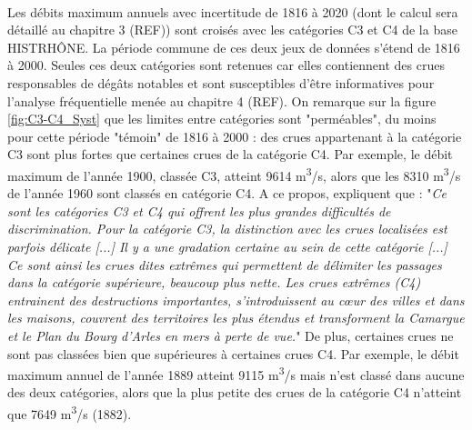 	\paragraph{} Les débits maximum annuels avec incertitude de 1816 à 2020 (dont le calcul sera détaillé au chapitre 3 (REF)) sont croisés avec les catégories C3 et C4 de la base HISTRHÔNE. La période commune de ces deux jeux de données s'étend de 1816 à 2000. Seules ces deux catégories sont retenues car elles contiennent des crues responsables de dégâts notables et sont susceptibles d'être informatives pour l'analyse fréquentielle menée au chapitre 4 (REF). On remarque sur la figure \ref{fig:C3-C4_Syst} que les limites entre catégories sont "perméables", du moins pour cette période "témoin" de 1816 à 2000 : des crues appartenant à la catégorie C3 sont plus fortes que certaines crues de la catégorie C4. Par exemple, le débit maximum de l'année 1900, classée C3, atteint 9614 m\textsuperscript{3}/s, alors que les 8310 m\textsuperscript{3}/s de l'année 1960 sont classés en catégorie C4. A ce propos, \citet{pichard_sept_2014} expliquent que : "\textit{Ce sont les catégories C3 et C4 qui offrent les plus grandes difficultés de discrimination. Pour la catégorie C3, la distinction avec les crues localisées est parfois délicate [...] Il y a une gradation certaine au sein de cette catégorie [...] Ce sont ainsi les crues dites extrêmes qui permettent de délimiter les passages dans la catégorie supérieure, beaucoup plus nette. Les crues extrêmes (C4) entrainent des destructions importantes, s'introduissent au cœur des villes et dans les maisons, couvrent des territoires les plus étendus et transforment la Camargue et le Plan du Bourg d'Arles en mers à perte de vue.}" De plus, certaines crues ne sont pas classées bien que supérieures à certaines crues C4. Par exemple, le débit maximum annuel de l'année 1889 atteint 9115 m\textsuperscript{3}/s mais n'est classé dans aucune des deux catégories, alors que la plus petite des crues de la catégorie C4 n'atteint que 7649 m\textsuperscript{3}/s (1882). 
	
